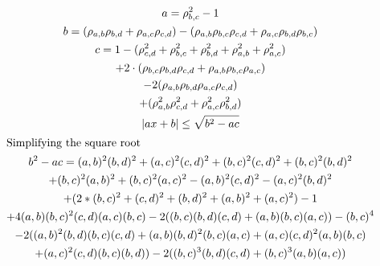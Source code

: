 \documentclass[a4paper]{article}
\begin{document}
\begin{theorem}
\begin{gather*}
a = \rho_{b,c}^2 -1 
\\
b = ( \rho_{a,b} \rho_{b,d} + \rho_{a,c} \rho_{c,d}) - ( \rho_{a,b} \rho_{b,c} \rho_{c,d} 
+ \rho_{a,c} \rho_{b,d} \rho_{b,c} ) 
\\
c = 1 - (\rho_{c,d}^2 + \rho_{b,c}^2 + \rho_{b,d}^2 + \rho_{a,b}^2 + \rho_{a,c}^2) 
\\
+ 2 \cdot (\rho_{b,c} \rho_{b,d} \rho_{c,d} 
+ \rho_{a,b} \rho_{b,c} \rho_{a,c}) 
\\
- 2 ( \rho_{a,b} \rho_{b,d} \rho_{a,c} \rho_{c,d} )
\\
+ (\rho_{a,b}^2 \rho_{c,d}^2 + \rho_{a,c}^2 \rho_{b,d}^2)
\\
|ax + b| \leq \sqrt{b^2 - ac}
\\
\shortintertext{Simplifying the square root}
b^2 - ac = (a,b)^2 (b,d)^2 + (a,c)^2 (c,d)^2 + (b,c)^2 (c,d)^2 +(b,c)^2 (b,d)^2
\\
 + (b,c)^2 (a,b)^2 + (b,c)^2 (a,c)^2 - (a,b)^2 (c,d)^2 -(a,c)^2 (b,d)^2 
\\
+(2*(b,c)^2 + (c,d)^2 + (b,d)^2 + (a,b)^2 + (a,c)^2) -1 
\\
+
4 (a,b)(b,c)^2 (c,d)(a,c)(b,c) - 2((b,c)(b,d)(c,d) + (a,b)(b,c)(a,c)) - (b,c)^4 
\\
- 2((a,b)^2 (b,d)(b,c)(c,d) + (a,b)(b,d)^2(b,c) (a,c) + (a,c)(c,d)^2 (a,b) (b,c) 
\\
+ (a,c)^2 (c,d) (b,c) (b,d)) - 2 ( (b,c)^3 (b,d) (c,d) + (b,c)^3 (a,b) (a,c))
\end{gather*}
\end{theorem}
\end{document}
